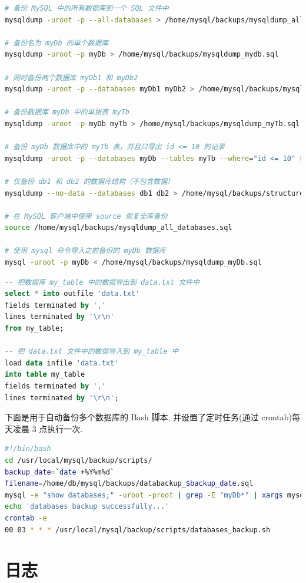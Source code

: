\begin{lstlisting}[language=bash]
# 备份 MySQL 中的所有数据库到一个 SQL 文件中
mysqldump -uroot -p --all-databases > /home/mysql/backups/mysqldump_all_databases.sql

# 备份名为 myDb 的单个数据库
mysqldump -uroot -p myDb > /home/mysql/backups/mysqldump_mydb.sql

# 同时备份两个数据库 myDb1 和 myDb2
mysqldump -uroot -p --databases myDb1 myDb2 > /home/mysql/backups/mysqldump_databases_mydb12.sql

# 备份数据库 myDb 中的单张表 myTb
mysqldump -uroot -p myDb myTb > /home/mysql/backups/mysqldump_myTb.sql

# 备份 myDb 数据库中的 myTb 表，并且只导出 id <= 10 的记录
mysqldump -uroot -p --databases myDb --tables myTb --where="id <= 10" > /home/mysql/backups/mysqldump_myTb10.sql

# 仅备份 db1 和 db2 的数据库结构（不包含数据）
mysqldump --no-data --databases db1 db2 > /home/mysql/backups/structure.sql

# 在 MySQL 客户端中使用 source 恢复全库备份
source /home/mysql/backups/mysqldump_all_databases.sql

# 使用 mysql 命令导入之前备份的 myDb 数据库
mysql -uroot -p myDb < /home/mysql/backups/mysqldump_myDb.sql
\end{lstlisting}

\begin{lstlisting}[language=sql]
-- 把数据库 my_table 中的数据导出到 data.txt 文件中
select * into outfile 'data.txt'
fields terminated by ','
lines terminated by '\r\n'
from my_table;

-- 把 data.txt 文件中的数据导入到 my_table 中
load data infile 'data.txt'
into table my_table
fields terminated by ','
lines terminated by '\r\n';
\end{lstlisting}

下面是用于自动备份多个数据库的 Bash 脚本, 并设置了定时任务(通过 crontab)每天凌晨 3 点执行一次.
\begin{lstlisting}[language=bash]
#!/bin/bash
cd /usr/local/mysql/backup/scripts/
backup_date=`date +%Y%m%d`
filename=/home/db/mysql/backups/databackup_$backup_date.sql
mysql -e "show databases;" -uroot -proot | grep -E "myDb*" | xargs mysqldump -uroot -proot --databases > $filename
echo 'databases backup successfully...'
crontab -e
00 03 * * * /usr/local/mysql/backup/scripts/databases_backup.sh
\end{lstlisting}

\section{日志}

